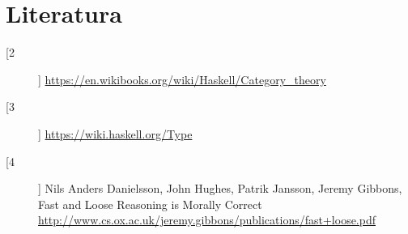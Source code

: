 \documentclass[11pt]{article}
\theoremstyle{definition}
\begin{document}
  \newpage
  \section*{Literatura}
  \begin{description}
    \item[[2]]
      \url {https://en.wikibooks.org/wiki/Haskell/Category\_theory}
    \item[[3]]
      \url {https://wiki.haskell.org/Type}

    \item[[4]] \label{bib:fast-loose}
      Nils Anders Danielsson, John Hughes, Patrik Jansson, Jeremy Gibbons,
Fast and Loose Reasoning is Morally Correct
\url{http://www.cs.ox.ac.uk/jeremy.gibbons/publications/fast+loose.pdf}
  \end{description}
\end{document}
